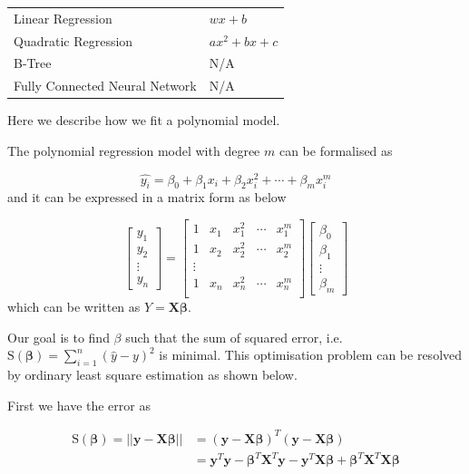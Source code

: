 \begin{table}[h]
  \begin{tabularx}{\textwidth}{@{}XX@{}}
  \toprule
    Linear Regression & $wx+b$ \\
    Quadratic Regression & $ax^2+bx+c$ \\
    B-Tree & N/A \\
    Fully Connected Neural Network & N/A \\
  \bottomrule
  \end{tabularx}
  \end{table}

Here we describe how we fit a polynomial model.

The polynomial regression model with degree $m$ can be formalised as 

$$ \hat{y_i}= \beta_0+\beta_1x_i+\beta_2x_i^2+\cdots+\beta_mx_i^m$$ and it can be expressed in a matrix form as below

$$
\begin{bmatrix}
y_1 \\ y_2\\ \vdots \\ y_n 
\end{bmatrix}=\begin{bmatrix}
1 & x_1 & x_1^2 &\cdots & x_1^m \\ 
1 & x_2 & x_2^2 &\cdots & x_2^m \\ 
\vdots \\ 
1 & x_n & x_n^2 &\cdots & x_n^m \\ 
\end{bmatrix}\begin{bmatrix}
\beta_0 \\ \beta_1 \\ \vdots \\ \beta_m 
\end{bmatrix}
$$ which can be written as $Y=\boldsymbol{X}\boldsymbol{\beta}$. 
 
 Our goal is to find $\beta$ such that the sum of squared error, i.e. $\text{S}(\boldsymbol{\beta})=\sum_{i=1}^n(\hat{y}-y)^2$ is minimal. This optimisation problem can be resolved by ordinary least square estimation as shown below.
 
 First we have the error as
 
 \begin{equation}
 \begin{split}
 \text{S}(\boldsymbol{\beta})=||\boldsymbol{y}-\boldsymbol{X} \boldsymbol{\beta}||& =(\boldsymbol{y}-\boldsymbol{X}\boldsymbol{\beta})^T(\boldsymbol{y}-\boldsymbol{X}\boldsymbol{\beta})\\
 	& =\boldsymbol{y}^T\boldsymbol{y}-\boldsymbol{\beta}^T\boldsymbol{X}^T\boldsymbol{y}-\boldsymbol{y}^T\boldsymbol{X}\boldsymbol{\beta}+\boldsymbol{\beta}^T\boldsymbol{X}^T\boldsymbol{X}\boldsymbol{\beta}
\end{split}
 \end{equation}
 
